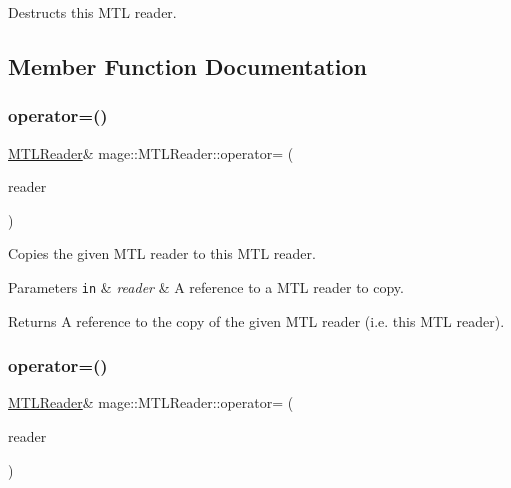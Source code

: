 Destructs this M\+TL reader. 

\subsection{Member Function Documentation}
\hypertarget{classmage_1_1_m_t_l_reader_ae239ac085326919918a418edabcafeae}{}\label{classmage_1_1_m_t_l_reader_ae239ac085326919918a418edabcafeae} 
\subsubsection{\texorpdfstring{operator=()}{operator=()}\hspace{0.1cm}{\footnotesize\ttfamily [1/2]}}
{\footnotesize\ttfamily \hyperlink{classmage_1_1_m_t_l_reader}{M\+T\+L\+Reader}\& mage\+::\+M\+T\+L\+Reader\+::operator= (\begin{DoxyParamCaption}\item[{const \hyperlink{classmage_1_1_m_t_l_reader}{M\+T\+L\+Reader} \&}]{reader }\end{DoxyParamCaption})\hspace{0.3cm}{\ttfamily [delete]}}

Copies the given M\+TL reader to this M\+TL reader.


\begin{DoxyParams}[1]{Parameters}
\mbox{\tt in}  & {\em reader} & A reference to a M\+TL reader to copy. \\
\hline
\end{DoxyParams}
\begin{DoxyReturn}{Returns}
A reference to the copy of the given M\+TL reader (i.\+e. this M\+TL reader). 
\end{DoxyReturn}
\hypertarget{classmage_1_1_m_t_l_reader_aa777389ff4a3cd2f1df2cbf5c6da708e}{}\label{classmage_1_1_m_t_l_reader_aa777389ff4a3cd2f1df2cbf5c6da708e} 
\subsubsection{\texorpdfstring{operator=()}{operator=()}\hspace{0.1cm}{\footnotesize\ttfamily [2/2]}}
{\footnotesize\ttfamily \hyperlink{classmage_1_1_m_t_l_reader}{M\+T\+L\+Reader}\& mage\+::\+M\+T\+L\+Reader\+::operator= (\begin{DoxyParamCaption}\item[{\hyperlink{classmage_1_1_m_t_l_reader}{M\+T\+L\+Reader} \&\&}]{reader }\end{DoxyParamCaption})\hspace{0.3cm}{\ttfamily [delete]}}

